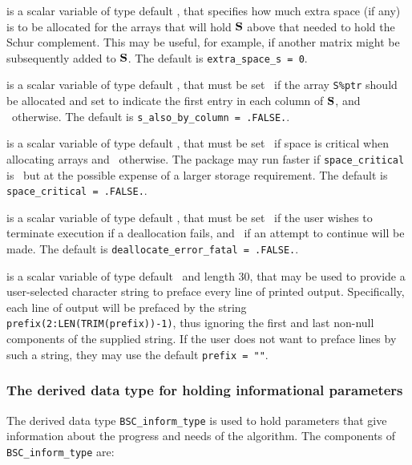 \documentclass{galahad}
\newcommand{\packagename}{BSC}
\begin{document}
\begin{description}
 is a scalar variable of type default \integer,
that specifies how much extra space (if any) is to be allocated for the arrays
that will hold ${\mathbf{S}}$ above that needed to hold the Schur complement.
This may be useful, for example, if another matrix might be subsequently added
to ${\mathbf{S}}$.
The default is {\tt extra\_space\_s = 0}.

 is a scalar variable of type default \logical,
that must be set \true\ if the array {\tt S\%ptr} should be allocated and set
to indicate the first entry in each column of ${\mathbf{S}}$, and  \false\ otherwise.
The default is {\tt s\_also\_by\_column = .FALSE.}.

 is a scalar variable of type default \logical,
that must be set \true\ if space is critical when allocating arrays
and  \false\ otherwise. The package may run faster if
{\tt space\_critical} is \false\ but at the possible expense of a larger
storage requirement. The default is {\tt space\_critical = .FALSE.}.

 is a scalar variable of type default \logical,
that must be set \true\ if the user wishes to terminate execution if
a deallocation  fails, and \false\ if an attempt to continue
will be made. The default is {\tt deallocate\_error\_fatal = .FALSE.}.

 is a scalar variable of type default \character\
and length 30, that may be used to provide a user-selected
character string to preface every line of printed output.
Specifically, each line of output will be prefaced by the string
{\tt prefix(2:LEN(TRIM(prefix))-1)},
thus ignoring the first and last non-null components of the
supplied string. If the user does not want to preface lines by such
a string, they may use the default {\tt prefix = ""}.

\end{description}


\subsubsection{The derived data type for holding informational
 parameters}\label{typeinform}
The derived data type
{\tt \packagename\_inform\_type}
is used to hold parameters that give information about the progress and needs
of the algorithm. The components of
{\tt \packagename\_inform\_type}
are:
\end{document}
